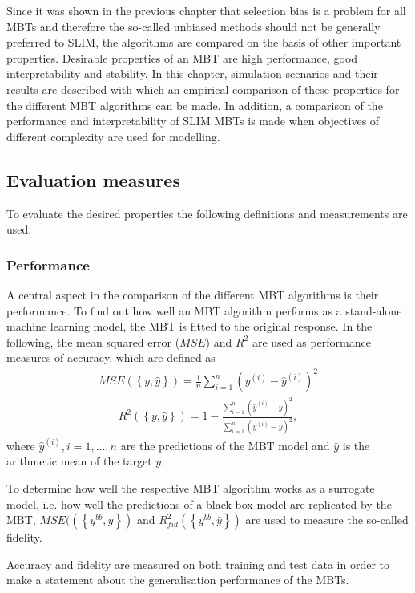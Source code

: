 Since it was shown in the previous chapter that selection bias is a problem for all MBTs and therefore the so-called unbiased methods should not be generally preferred to SLIM, the algorithms are compared on the basis of other important properties.
Desirable properties of an MBT are high performance, good interpretability and stability.
In this chapter, simulation scenarios and their results are described with which an empirical comparison of these properties for the different MBT algorithms can be made.
In addition, a comparison of the performance and interpretability of SLIM MBTs is made when objectives of different complexity are used for modelling.

\subsection{Evaluation measures}
To evaluate the desired properties the following definitions and measurements are used.

\subsubsection{Performance}
A central aspect in the comparison of the different MBT algorithms is their performance. 
To find out how well an MBT algorithm performs as a stand-alone machine learning model, the MBT is fitted to the original response. 
In the following, the mean squared error ($MSE$) and $R^2$ are used as performance measures of accuracy, which are defined as
\begin{align}
    MSE \left( \left\{y, \hat{y}\right\}\right) = \frac{1}{n}\sum_{i = 1}^{n}\left(y^{(i)}-\hat{y}^{(i)}\right)^2
\end{align}
\begin{align}
    R^2\left( \left\{y, \hat{y}\right\}\right) = 1-\frac{\sum_{i = 1}^{n}\left(\hat{y}^{(i) } - y\right)^2}{\sum_{i = 1}^{n}\left(y^{(i)} - \bar{y}\right)^2},
\end{align}
where $\hat{y}^{(i)}, i = 1,...,n$ are the predictions of the MBT model and $\bar{y}$ is the arithmetic mean of the target $y$.

To determine how well the respective MBT algorithm works as a surrogate model, i.e. how well the predictions of a black box model are replicated by the MBT, $MSE(\left( \left\{y^{bb}, \hat{y}\right\}\right)$ and $R^2_{fid}\left( \left\{y^{bb}, \hat{y}\right\}\right)$ are used to measure the so-called fidelity. 

Accuracy and fidelity are measured on both training and test data in order to make a statement about the generalisation performance of the MBTs.

